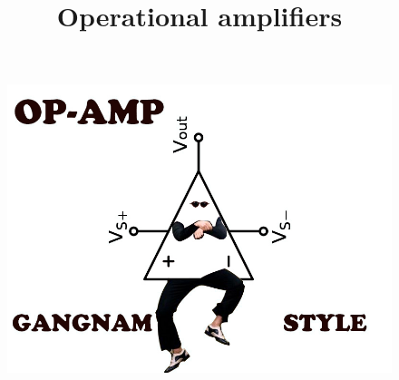 \documentclass[beamer]{standalone}
\begin{document}
\title[Electronics 1]{Operational amplifiers}

\begin{frame} 
  \titlepage
  \begin{figure}
  \includegraphics[height=0.4\textheight]{./pics/op_amp_gangnam_style_transparent.jpg}
  \end{figure}
\end{frame}
\end{document}
